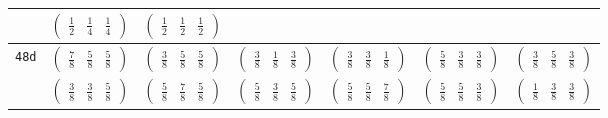 \documentclass[fleqn,9pt,landscape]{jsarticle}
\begin{document}
\begin{center}
\begin{longtable}{ccccccc}
& $ \begin{pmatrix} \frac{1}{2} & \frac{1}{4} & \frac{1}{4} \end{pmatrix} $ & $ \begin{pmatrix} \frac{1}{2} & \frac{1}{2} & \frac{1}{2} \end{pmatrix} $ & $  $ & $  $ & $  $ & $  $ \\ \hline
{\tt 48d} & $ \begin{pmatrix} \frac{7}{8} & \frac{5}{8} & \frac{5}{8} \end{pmatrix} $ & $ \begin{pmatrix} \frac{3}{8} & \frac{5}{8} & \frac{5}{8} \end{pmatrix} $ & $ \begin{pmatrix} \frac{3}{8} & \frac{1}{8} & \frac{3}{8} \end{pmatrix} $ & $ \begin{pmatrix} \frac{3}{8} & \frac{3}{8} & \frac{1}{8} \end{pmatrix} $ & $ \begin{pmatrix} \frac{5}{8} & \frac{3}{8} & \frac{3}{8} \end{pmatrix} $ & $ \begin{pmatrix} \frac{3}{8} & \frac{5}{8} & \frac{3}{8} \end{pmatrix} $ \\
& $ \begin{pmatrix} \frac{3}{8} & \frac{3}{8} & \frac{5}{8} \end{pmatrix} $ & $ \begin{pmatrix} \frac{5}{8} & \frac{7}{8} & \frac{5}{8} \end{pmatrix} $ & $ \begin{pmatrix} \frac{5}{8} & \frac{3}{8} & \frac{5}{8} \end{pmatrix} $ & $ \begin{pmatrix} \frac{5}{8} & \frac{5}{8} & \frac{7}{8} \end{pmatrix} $ & $ \begin{pmatrix} \frac{5}{8} & \frac{5}{8} & \frac{3}{8} \end{pmatrix} $ & $ \begin{pmatrix} \frac{1}{8} & \frac{3}{8} & \frac{3}{8} \end{pmatrix} $ \\ \hline

\end{longtable}
\end{center}
\end{document}
